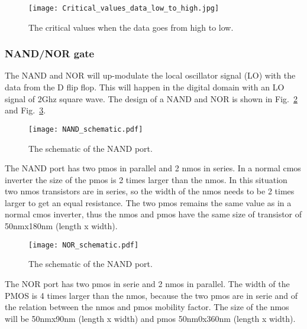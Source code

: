 \begin{figure}[h]
\texttt{[image: Critical\_values\_data\_low\_to\_high.jpg]}
\caption{The critical values when the data goes from high to low.}
\label{fig:Critical_values_data_low_to_high_figure}
\end{figure}

\subsubsection{NAND/NOR gate}\label{sec:frontend}
The NAND and NOR will up-modulate the local oscillator signal (LO) with the data from the D flip flop. This will happen in the digital domain with an LO signal of 2Ghz square wave.
The design of a NAND and NOR is shown in Fig.~\ref{fig:NAND_schematic_figure} and Fig.~\ref{fig:NOR_schematic_figure}.

\begin{figure}[htp]
\texttt{[image: NAND\_schematic.pdf]}
\caption{The schematic of the NAND port.}
\label{fig:NAND_schematic_figure}
\end{figure}

The NAND port has two pmos in parallel and 2 nmos in series. In a normal cmos inverter the size of the pmos is 2 times larger than the nmos. In this situation two nmos transistors are in series, so the width of the nmos needs to be 2 times larger to get an equal resistance. The two pmos remains the same value as in a normal cmos inverter, thus the nmos and pmos have the same size of transistor of 50nmx180nm (length x width).

\begin{figure}[htp]
\texttt{[image: NOR\_schematic.pdf]}
\caption{The schematic of the NAND port.}
\label{fig:NOR_schematic_figure}
\end{figure}

The NOR port has two pmos in serie and 2 nmos in parallel. The width of the PMOS is 4 times larger than the nmos, because the two pmos are in serie and of the relation between the nmos and pmos mobility factor. The size of the nmos will be 50nmx90nm (length x width) and pmos 50nm0x360nm (length x width).
